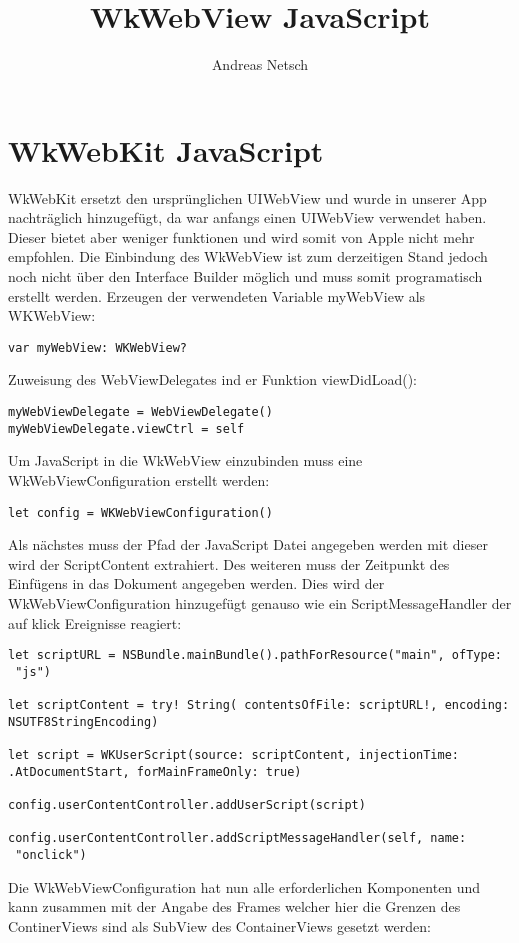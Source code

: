 
\title{WkWebView JavaScript}
\author{Andreas Netsch}



\section{ WkWebKit JavaScript}

WkWebKit ersetzt den ursprünglichen UIWebView und wurde in unserer App nachträglich hinzugefügt, da war anfangs einen UIWebView verwendet haben. Dieser bietet aber weniger funktionen und wird somit von Apple nicht mehr empfohlen. Die Einbindung des WkWebView ist zum derzeitigen Stand jedoch noch nicht über den Interface Builder möglich und muss somit programatisch erstellt werden.
Erzeugen der verwendeten Variable myWebView als WKWebView:
\begin{verbatim}
var myWebView: WKWebView?
\end{verbatim}
Zuweisung des WebViewDelegates ind er Funktion viewDidLoad():
\begin{verbatim}
myWebViewDelegate = WebViewDelegate()
myWebViewDelegate.viewCtrl = self
\end{verbatim}
Um JavaScript in die WkWebView einzubinden muss eine WkWebViewConfiguration erstellt werden:
\begin{verbatim}
let config = WKWebViewConfiguration()
\end{verbatim}
Als nächstes muss der Pfad der JavaScript Datei angegeben werden mit dieser wird der ScriptContent extrahiert. Des weiteren muss der Zeitpunkt des Einfügens in das Dokument angegeben werden. Dies wird der WkWebViewConfiguration hinzugefügt genauso wie ein ScriptMessageHandler der auf klick Ereignisse reagiert:
\begin{verbatim}
let scriptURL = NSBundle.mainBundle().pathForResource("main", ofType:
 "js")
 
let scriptContent = try! String( contentsOfFile: scriptURL!, encoding:
NSUTF8StringEncoding)

let script = WKUserScript(source: scriptContent, injectionTime: 
.AtDocumentStart, forMainFrameOnly: true)

config.userContentController.addUserScript(script)
        
config.userContentController.addScriptMessageHandler(self, name:
 "onclick")
\end{verbatim}
Die WkWebViewConfiguration hat nun alle erforderlichen Komponenten und kann zusammen mit der Angabe des Frames welcher hier die Grenzen des ContinerViews sind als SubView des ContainerViews gesetzt werden:
